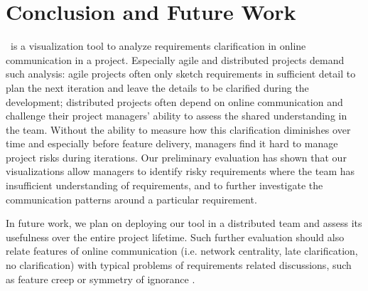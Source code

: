 \section{Conclusion and Future Work}
 \viss\ is a visualization tool to analyze requirements clarification in online communication in a project.
Especially agile and distributed projects demand such analysis: agile projects often only sketch requirements in sufficient detail to plan the next iteration and leave the details to be clarified during the development; distributed projects often depend on online communication and challenge their project managers' ability to assess the shared understanding in the team. 
Without the ability to measure how this clarification diminishes over time and especially before feature delivery, managers find it hard to manage project risks during iterations.
Our preliminary evaluation has shown that our visualizations allow managers to identify risky requirements where the team has insufficient understanding of requirements, and to further investigate the communication patterns around a particular requirement. %
 
In future work, we plan on deploying our tool in a distributed team and assess its usefulness over the entire project lifetime. Such further evaluation should also relate features of online communication (i.e. network centrality, late clarification, no clarification) with typical problems of requirements related discussions, such as feature creep \cite{Jones1996} or symmetry of ignorance \cite{Fischer2000}.




